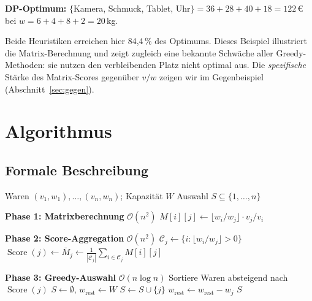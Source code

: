 \documentclass[a4paper,11pt]{article}
\begin{document}
\medskip
\noindent
\textbf{DP-Optimum:}
$\{$Kamera, Schmuck, Tablet, Uhr$\} = 36+28+40+18 = 122$\,\euro{} bei
$w = 6+4+8+2 = 20$\,kg.

Beide Heuristiken erreichen hier 84{,}4\,\% des Optimums.
Dieses Beispiel illustriert die Matrix-Berechnung und zeigt zugleich
eine bekannte Schwäche aller Greedy-Methoden: sie nutzen den
verbleibenden Platz nicht optimal aus.
Die \emph{spezifische} Stärke des Matrix-Scores gegenüber $v/w$
zeigen wir im Gegenbeispiel (Abschnitt~\ref{sec:gegen}).

\section{Algorithmus}
\label{sec:algo}

\subsection{Formale Beschreibung}

\begin{algorithm}[H]
\caption{Matrix-Score-Heuristik für das 0/1-Knapsack-Problem}
\label{alg:matrixscore}
\begin{algorithmic}[1]
\Require Waren $(v_1,w_1),\ldots,(v_n,w_n)$; Kapazität $W$
\Ensure Auswahl $S \subseteq \{1,\ldots,n\}$

\medskip
\Statex \textbf{Phase 1: Matrixberechnung} \hfill $\mathcal{O}(n^2)$
    \State $M[i][j] \gets \lfloor w_i / w_j \rfloor \cdot v_j / v_i$
  \EndFor
\EndFor

\medskip
\Statex \textbf{Phase 2: Score-Aggregation} \hfill $\mathcal{O}(n^2)$
  \State $\mathcal{C}_j \gets \{i : \lfloor w_i/w_j \rfloor > 0\}$
  \State $\operatorname{Score}(j) \gets \bar{M}_j \gets
    \frac{1}{|\mathcal{C}_j|} \sum_{i \in \mathcal{C}_j} M[i][j]$
\EndFor

\medskip
\Statex \textbf{Phase 3: Greedy-Auswahl} \hfill $\mathcal{O}(n \log n)$
\State Sortiere Waren absteigend nach $\operatorname{Score}(j)$
\State $S \gets \emptyset$, $w_{\text{rest}} \gets W$
    \State $S \gets S \cup \{j\}$
    \State $w_{\text{rest}} \gets w_{\text{rest}} - w_j$
  \EndIf
\EndFor
\State \Return $S$
\end{algorithmic}
\end{algorithm}
\end{document}
